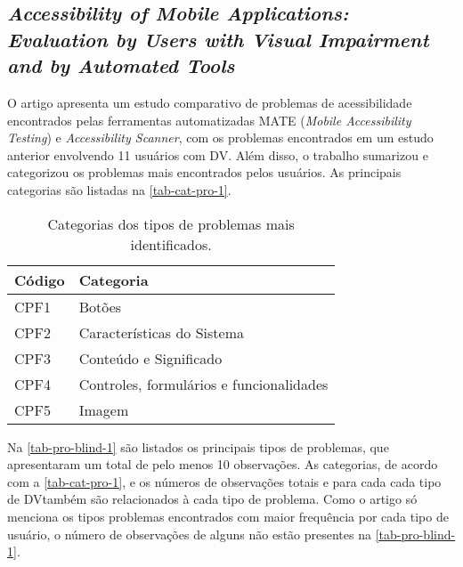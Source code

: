 \subsection{\emph{Accessibility of Mobile Applications: Evaluation by Users with Visual Impairment and by Automated Tools}}

O artigo apresenta um estudo comparativo de problemas de acessibilidade encontrados pelas ferramentas automatizadas MATE (\emph{Mobile Accessibility Testing}) e \emph{Accessibility Scanner}, com os problemas encontrados em um estudo anterior envolvendo 11 usuários com DV\@.
Além disso, o trabalho sumarizou e categorizou os problemas mais encontrados pelos usuários.
As principais categorias são listadas na \autoref{tab-cat-pro-1}.

\begin{table}[htb]
  \begin{center}
    \ABNTEXfontereduzida
    \caption{Categorias dos tipos de problemas mais identificados.}
    \label{tab-cat-pro-1}
    \begin{tabular}{p{2.0cm}|p{7cm}}
      \textbf{Código} & \textbf{Categoria}                       \\
      \hline
      CPF1            & Botões                                   \\
      \hline
      CPF2            & Características do Sistema               \\
      \hline
      CPF3            & Conteúdo e Significado                   \\
      \hline
      CPF4            & Controles, formulários e funcionalidades \\
      \hline
      CPF5            & Imagem                                   \\
    \end{tabular}
  \end{center}
\end{table}

Na \autoref{tab-pro-blind-1} são listados os principais tipos de problemas, que apresentaram um total de pelo menos 10 observações.
As categorias, de acordo com a \autoref{tab-cat-pro-1}, e os números de observações totais e para cada cada tipo de DV\@ também são relacionados à cada tipo de problema.
Como o artigo só menciona os tipos problemas encontrados com maior frequência por cada tipo de usuário, o número de observações de alguns não estão presentes na \autoref{tab-pro-blind-1}.

